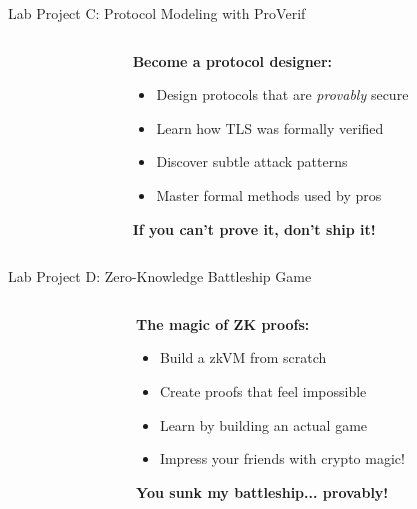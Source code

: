\documentclass[aspectratio=169, lualatex, handout]{beamer}
\begin{document}
\begin{frame}{Lab Project C: Protocol Modeling with ProVerif}
	\begin{columns}[c]
		\begin{column}{0.5\textwidth}
		\end{column}
		\begin{column}{0.5\textwidth}
			\textbf{Become a protocol designer:}
			\begin{itemize}[<+->]
				\item Design protocols that are \textit{provably} secure
				\item Learn how TLS was formally verified
				\item Discover subtle attack patterns
				\item Master formal methods used by pros
			\end{itemize}
			\vspace{0.5cm}
			\textcolor{cipherprimary}{\textbf{If you can't prove it, don't ship it!}}
		\end{column}
	\end{columns}
\end{frame}

\begin{frame}{Lab Project D: Zero-Knowledge Battleship Game}
	\begin{columns}[c]
		\begin{column}{0.5\textwidth}
		\end{column}
		\begin{column}{0.5\textwidth}
			\textbf{The magic of ZK proofs:}
			\begin{itemize}[<+->]
				\item Build a zkVM from scratch
				\item Create proofs that feel impossible
				\item Learn by building an actual game
				\item Impress your friends with crypto magic!
			\end{itemize}
			\vspace{0.5cm}
			\textcolor{cipherprimary}{\textbf{You sunk my battleship... provably!}}
		\end{column}
	\end{columns}
\end{frame}
\end{document}
